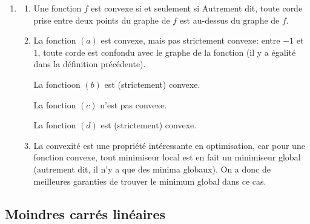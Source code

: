 \documentclass{article}
\begin{document}
\begin{enumerate}
\begin{enumerate}
		\item Calculons le gradient de $f$. On a
		donc 
		En particulier,
		donc $[0,0]^\top$ n'est pas un minimiseur local du problème.
	\end{enumerate}
	
	\item \begin{enumerate}
		\item Une fonction $f$ est convexe si et seulement si
		Autrement dit, toute corde prise entre deux points du graphe de $f$ est au-dessus du graphe de $f$.
		
		\item La fonction $(a)$ est convexe, mais pas strictement convexe: entre $-1$ et $1$, toute corde est confondu avec le graphe de la fonction (il y a égalité dans la définition précédente).
		
		La fonctioon $(b)$ est (strictement) convexe.
		
		La fonction $(c)$ n'est pas convexe.
		
		La fonction $(d)$ est (strictement) convexe.
		
		\item La convexité est une propriété intéressante en optimisation, car pour une fonction convexe, tout minimiseur local est en fait un minimiseur global (autrement dit, il n'y a que des minima globaux). On a donc de meilleures garanties de trouver le minimum global dans ce cas.
	\end{enumerate}
\end{enumerate}


\subsection{Moindres carrés linéaires}
\end{document}

